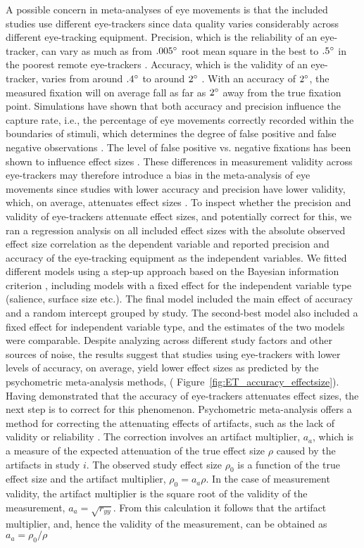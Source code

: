 A possible concern in meta-analyses of eye movements is that the included studies use different eye-trackers since data quality varies considerably across different eye-tracking equipment. Precision, which is the reliability of an eye-tracker, can vary as much as from $.005\degree$ root mean square in the best to $.5\degree$ in the poorest remote eye-trackers \citep{holmqvist2015a}. Accuracy, which is the validity of an eye-tracker, varies from around $.4\degree$ to around $2\degree$ \citep{holmqvist2015a}. With an accuracy of $2\degree$, the measured fixation will on average fall as far as $2\degree$ away from the true fixation point. Simulations have shown that both accuracy and precision influence the capture rate, i.e., the percentage of eye movements correctly recorded within the boundaries of stimuli, which determines the degree of false positive and false negative observations \citep{orquin2019a}. The level of false positive vs. negative fixations has been shown to influence effect sizes \citep{orquin2016a}. These differences in measurement validity across eye-trackers may therefore introduce a bias in the meta-analysis of eye movements since studies with lower accuracy and precision have lower validity, which, on average, attenuates effect sizes \citep{hunter2004a}. To inspect whether the precision and validity of eye-trackers attenuate effect sizes, and potentially correct for this, we ran a regression analysis on all included effect sizes with the absolute observed effect size correlation as the dependent variable and reported precision and accuracy of the eye-tracking equipment as the independent variables. We fitted different models using a step-up approach \citep{ryoo2011model} based on the Bayesian information criterion \citep{Schwarz1978}, including models with a fixed effect for the independent variable type (salience, surface size etc.). The final model included the main effect of accuracy and a random intercept grouped by study. The second-best model also included a fixed effect for independent variable type, and the estimates of the two models were comparable. Despite analyzing across different study factors and other sources of noise, the results suggest that studies using eye-trackers with lower levels of accuracy, on average, yield lower effect sizes as predicted by the psychometric meta-analysis methods, ( Figure~\ref{fig:ET_accuracy_effectsize}). Having demonstrated that the accuracy of eye-trackers attenuates effect sizes, the next step is to correct for this phenomenon. Psychometric meta-analysis offers a method for correcting the attenuating effects of artifacts, such as the lack of validity or reliability \citep{hunter2004a}. The correction involves an artifact multiplier, $a_a$, which is a measure of the expected attenuation of the true effect size $\rho$ caused by the artifacts in study $i$. The observed study effect size $\rho_0$ is a function of the true effect size and the artifact multiplier, $\rho_0 = a_a \rho$. In the case of measurement validity, the artifact multiplier is the square root of the validity of the measurement, $a_a = \sqrt{r_{yy}}$. From this calculation it follows that the artifact multiplier, and, hence the validity of the measurement, can be obtained as $a_a = \rho_0 / \rho$ 
